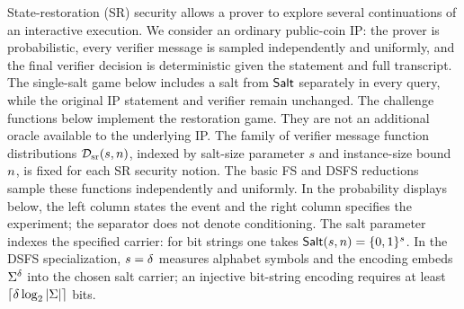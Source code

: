 State-restoration (SR) security allows a prover to explore several continuations of an interactive execution. We consider an ordinary public-coin IP: the prover is probabilistic, every verifier message is sampled independently and uniformly, and the final verifier decision is deterministic given the statement and full transcript. The single-salt game below includes a salt from \(\mathsf{Salt}\) separately in every query, while the original IP statement and verifier remain unchanged. The challenge functions below implement the restoration game. They are not an additional oracle available to the underlying IP. The family of verifier message function distributions \(\mathcal{D}_{\mathrm{sr}}(s,n)\), indexed by salt-size parameter \(s\) and instance-size bound \(n\), is fixed for each SR security notion. The basic FS and DSFS reductions sample these functions independently and uniformly. In the probability displays below, the left column states the event and the right column specifies the experiment; the separator does not denote conditioning. The salt parameter indexes the specified carrier: for bit strings one takes \(\mathsf{Salt}(s,n)=\{0,1\}^{s}\). In the DSFS specialization, \(s=\delta\) measures alphabet symbols and the encoding embeds \(\Sigma^{\delta}\) into the chosen salt carrier; an injective bit-string encoding requires at least \(\lceil\delta\log_2|\Sigma|\rceil\) bits.

